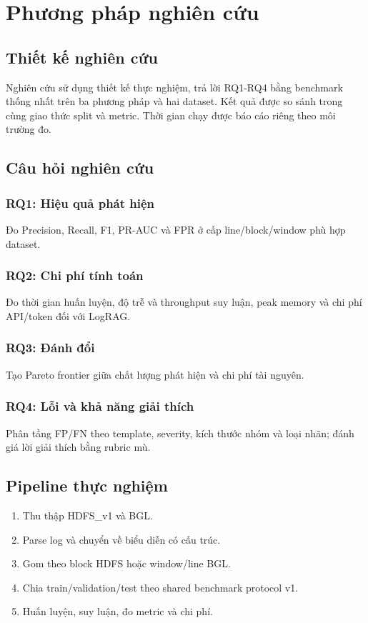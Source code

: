\chapter{Phương pháp nghiên cứu}

\section{Thiết kế nghiên cứu}
Nghiên cứu sử dụng thiết kế thực nghiệm, trả lời RQ1-RQ4 bằng benchmark thống
nhất trên ba phương pháp và hai dataset. Kết quả được so sánh trong cùng giao
thức split và metric. Thời gian chạy được báo cáo riêng theo môi trường đo.

\section{Câu hỏi nghiên cứu}
\subsection{RQ1: Hiệu quả phát hiện}
Đo Precision, Recall, F1, PR-AUC và FPR ở cấp line/block/window phù hợp dataset.
\subsection{RQ2: Chi phí tính toán}
Đo thời gian huấn luyện, độ trễ và throughput suy luận, peak memory và chi phí
API/token đối với LogRAG.
\subsection{RQ3: Đánh đổi}
Tạo Pareto frontier giữa chất lượng phát hiện và chi phí tài nguyên.
\subsection{RQ4: Lỗi và khả năng giải thích}
Phân tầng FP/FN theo template, severity, kích thước nhóm và loại nhãn; đánh giá
lời giải thích bằng rubric mù.

\section{Pipeline thực nghiệm}
\begin{enumerate}
  \item Thu thập HDFS\_v1 và BGL.
  \item Parse log và chuyển về biểu diễn có cấu trúc.
  \item Gom theo block HDFS hoặc window/line BGL.
  \item Chia train/validation/test theo shared benchmark protocol v1.
  \item Huấn luyện, suy luận, đo metric và chi phí.
\end{enumerate}

